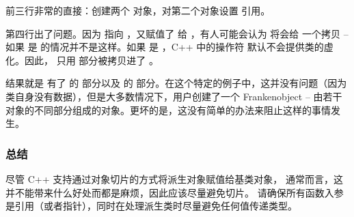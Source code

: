 \documentclass[../../LearnCpp.tex]{subfiles}
\begin{document}
前三行非常的直接：创建两个  对象，对第二个对象设置  引用。

第四行出了问题。因为  指向 ，又赋值了  给 ，有人可能会认为  将会给  一个拷贝 -- 如果  是  的情况并不是这样。如果  是 ，C++ 中的操作符 \acode{=} 默认不会提供类的虚化。因此， 只用  部分被拷贝进了 。

结果就是  有了  的  部分以及  的  部分。在这个特定的例子中，这并没有问题（因为  类自身没有数据），但是大多数情况下，用户创建了一个 Frankenobject -- 由若干对象的不同部分组成的对象。更坏的是，这没有简单的办法来阻止这样的事情发生。

\subsubsection*{总结}

尽管 C++ 支持通过对象切片的方式将派生对象赋值给基类对象，
通常而言，这并不能带来什么好处而都是麻烦，因此应该尽量避免切片。
请确保所有函数入参是引用（或者指针），同时在处理派生类时尽量避免任何值传递类型。
\end{document}
